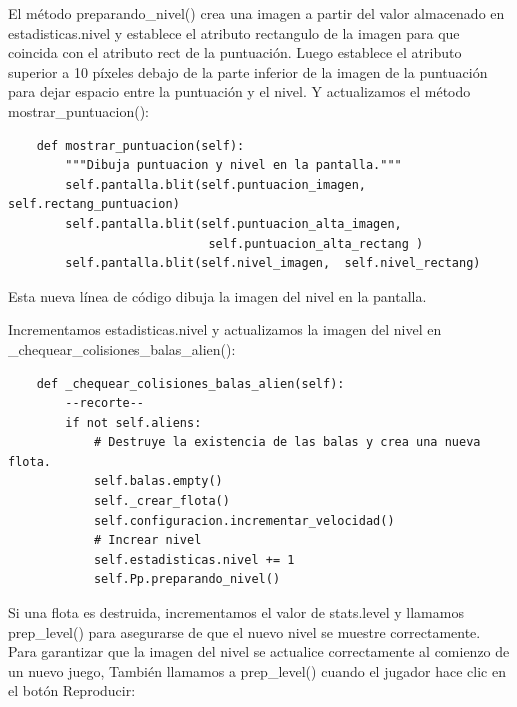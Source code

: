 El método {\ttfamily  preparando\_nivel()} crea una imagen a partir del valor almacenado en
{\ttfamily estadisticas.nivel} y establece el atributo {\ttfamily rectangulo } de la imagen para que coincida con el atributo {\ttfamily rect} de la puntuación.  Luego establece el atributo superior a 10 píxeles debajo de la parte inferior de
la imagen de la puntuación  para dejar espacio entre la  puntuación y el nivel.
Y actualizamos el método  {\ttfamily mostrar\_puntuacion()}:


\hspace{-2.9cm}{\ttfamily \scriptsize puntuacion.py}  \vspace{-0.5cm}
\begin{lstlisting}	
    def mostrar_puntuacion(self):
        """Dibuja puntuacion y nivel en la pantalla."""
        self.pantalla.blit(self.puntuacion_imagen, self.rectang_puntuacion)
        self.pantalla.blit(self.puntuacion_alta_imagen, 
                            self.puntuacion_alta_rectang )
        self.pantalla.blit(self.nivel_imagen,  self.nivel_rectang)
\end{lstlisting}

Esta nueva línea de código dibuja la imagen del nivel en la pantalla.


Incrementamos {\ttfamily estadisticas.nivel} y actualizamos la imagen del nivel en {\ttfamily \_chequear\_colisiones\_balas\_alien()}:


\hspace{-2.4cm}{\ttfamily \scriptsize invasión}

\vspace{-0.2cm}
\hspace{-2.1cm}{\ttfamily \scriptsize \_alien.py}\vspace{-0.84cm}
\begin{lstlisting}		
    def _chequear_colisiones_balas_alien(self):
        --recorte--
        if not self.aliens:
            # Destruye la existencia de las balas y crea una nueva flota.
            self.balas.empty()
            self._crear_flota()
            self.configuracion.incrementar_velocidad()
            # Increar nivel
            self.estadisticas.nivel += 1
            self.Pp.preparando_nivel()	
\end{lstlisting}

Si una flota es destruida, incrementamos el valor de stats.level y llamamos
prep\_level() para asegurarse de que el nuevo nivel se muestre correctamente.
Para garantizar que la imagen del nivel se actualice correctamente al comienzo de un nuevo juego,
También llamamos a prep\_level() cuando el jugador hace clic en el botón Reproducir:


